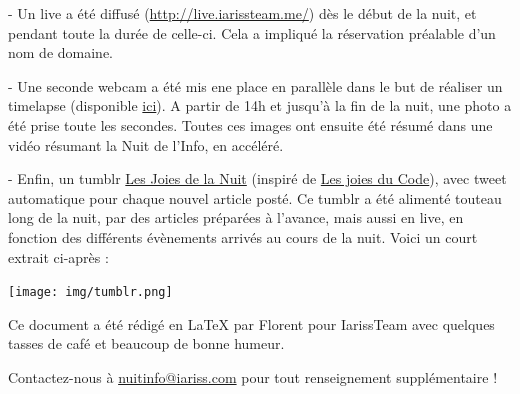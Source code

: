 \documentclass[12pt, a4paper]{article}
\newcommand{\espace}{\vspace{.8cm}}
\newcommand{\authors}{Florent}
\begin{document}
- Un live a été diffusé (\href{http://live.iarissteam.me/}{http://live.iarissteam.me/}) dès le début de la nuit, et pendant toute la durée de celle-ci. Cela a impliqué la réservation préalable d'un nom de domaine.

- Une seconde webcam a été mis ene place en parallèle dans le but de réaliser un timelapse (disponible \href{ici}{ici}). A partir de 14h et jusqu'à la fin de la nuit, une photo a été prise toute les secondes. Toutes ces images ont ensuite été résumé dans une vidéo résumant la Nuit de l'Info, en accéléré.

- Enfin, un tumblr \href{http://lesjoiesdelanuit.tumblr.com/}{Les Joies de la Nuit} (inspiré de \href{http://lesjoiesducode.tumblr.com/}{Les joies du Code}), avec tweet automatique pour chaque nouvel article posté. Ce tumblr a été alimenté touteau long de la nuit, par des articles préparées à l'avance, mais aussi en \og{}live\fg{}, en fonction des différents évènements arrivés au cours de la nuit. Voici un court extrait ci-après : 

\espace{}
\begin{center}
\texttt{[image: img/tumblr.png]}
\end{center}
\espace{}




\espace\vfill{}
Ce document a été rédigé en \LaTeX{} par \authors{} pour IarissTeam avec quelques tasses de café et beaucoup de bonne humeur.

Contactez-nous à \href{mailto:nuitinfo@iariss.com}{nuitinfo@iariss.com} pour tout renseignement supplémentaire !
\end{document}
